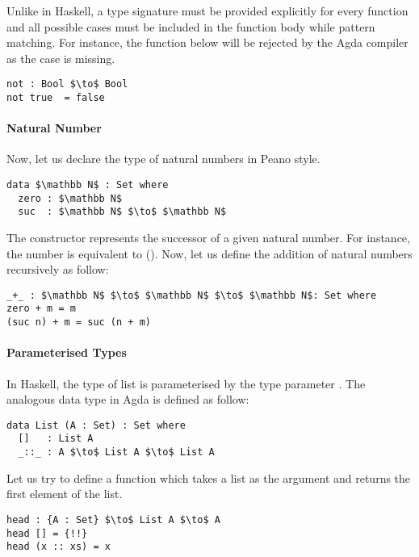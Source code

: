 \par Unlike in Haskell, a type signature must be provided explicitly for every
function and all possible cases must be included in the function body
while pattern matching. For instance, the function below will be rejected
by the Agda compiler as the case  is missing. 
\begin{lstlisting}[mathescape=true,xleftmargin=.3\textwidth]
not : Bool $\to$ Bool
not true  = false
\end{lstlisting}

\paragraph{Natural Number} Now, let us declare the type of natural
numbers in Peano style. 
\begin{lstlisting}[mathescape=true,xleftmargin=.3\textwidth]
data $\mathbb N$ : Set where
  zero : $\mathbb N$
  suc  : $\mathbb N$ $\to$ $\mathbb N$
\end{lstlisting} 

\par The constructor  represents the successor of a given
natural number. For instance, the number  is equivalent to
(). Now, let us define the addition of natural numbers recursively as follow:
\begin{lstlisting}[mathescape=true,xleftmargin=.3\textwidth]
_+_ : $\mathbb N$ $\to$ $\mathbb N$ $\to$ $\mathbb N$: Set where
zero + m = m
(suc n) + m = suc (n + m)
\end{lstlisting} 

\paragraph{Parameterised Types} In Haskell, the type of list \mb{[a]} is parameterised by the type
parameter . The analogous data type in Agda is defined as follow:
\begin{lstlisting}[mathescape=true,xleftmargin=.3\textwidth]
data List (A : Set) : Set where
  []   : List A
  _::_ : A $\to$ List A $\to$ List A
\end{lstlisting} 

\par Let us try to define a function which takes a
list as the argument and returns the first element of the list. 
\begin{lstlisting}[mathescape=true,xleftmargin=.3\textwidth]
head : {A : Set} $\to$ List A $\to$ A
head [] = {!!}
head (x :: xs) = x
\end{lstlisting} 

